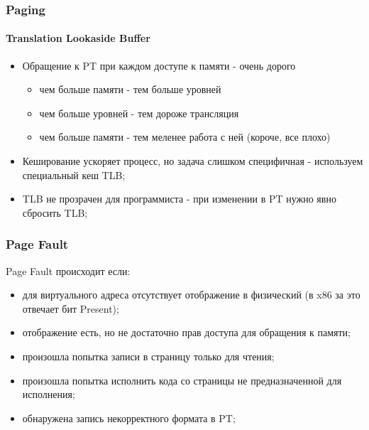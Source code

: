 \begin{frame}
\frametitle{Paging}
\framesubtitle{Translation Lookaside Buffer}

\begin{itemize}
  \item<1-> Обращение к PT при каждом доступе к памяти - очень дорого
    \begin{itemize}
      \item чем больше памяти - тем больше уровней
      \item чем больше уровней - тем дороже трансляция
      \item чем больше памяти - тем меленее работа с ней (короче, все плохо)
    \end{itemize}
  \item<2-> Кеширование ускоряет процесс, но задача слишком специфичная - используем специальный кеш TLB;
  \item<3-> TLB не прозрачен для программиста - при изменении в PT нужно явно сбросить TLB;
\end{itemize}
\end{frame}

\begin{frame}
\frametitle{Page Fault}

Page Fault происходит если:
\begin{itemize}
  \item для виртуального адреса отсутствует отображение в физический (в x86 за это отвечает бит Present);
  \item отображение есть, но не достаточно прав доступа для обращения к памяти;
  \item произошла попытка записи в страницу только для чтения;
  \item произошла попытка исполнить кода со страницы не предназначенной для исполнения;
  \item обнаружена запись некорректного формата в PT;
\end{itemize}


\end{frame}

